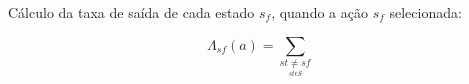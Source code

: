 \begin{frame}
  Cálculo da taxa de saída de cada estado \alert{$s _{f}$}, quando a ação \alert{$s _{f}$} selecionada:
  \begin{center}
      \item $$\Lambda_{sf}(a) =\sum_{\underset{st \epsilon S}{st \neq sf}} $$
  \end{center}
\end{frame}
%
%
%
